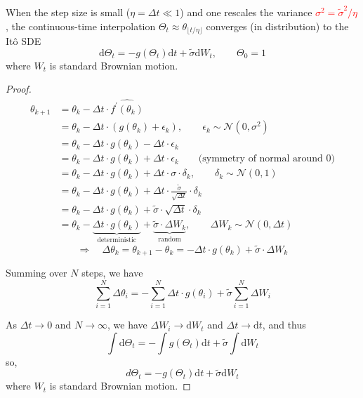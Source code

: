 \documentclass[10pt, headings=standardclasses, parskip=half, twoside]{scrartcl}
\begin{document}
\begin{theorem}\label{thm:SGD_to_SDE}
When the step size is small ($\eta=\Delta t \ll 1$) and one rescales the variance \textcolor{red}{$\sigma^2= \tilde{\sigma}^2 / \eta$}, the continuous-time interpolation $\Theta_t \approx \theta_{\lfloor t / \eta\rfloor}$ converges (in distribution) to the Itô SDE
$$
\mathrm{d} \Theta_t=-g\left(\Theta_t\right) \mathrm{d} t+\tilde{\sigma} \mathrm{d} W_t, \qquad \Theta_0=1
$$
where $W_t$ is standard Brownian motion.
\end{theorem}
\begin{proof}
\[
\begin{aligned}
\theta_{k+1} 
&= \theta_k - \Delta t \cdot \widehat{f^{\prime}\left(\theta_k\right)} \\
&= \theta_k - \Delta t \cdot (g(\theta_k) + \epsilon_k), \qquad \epsilon_k \sim \mathcal{N}(0, \sigma^2) \\
&= \theta_k - \Delta t \cdot g(\theta_k) - \Delta t \cdot \epsilon_k \\
&= \theta_k - \Delta t \cdot g(\theta_k) + \Delta t \cdot \epsilon_k \qquad \text{(symmetry of normal around 0)} \\
&= \theta_k - {\Delta t \cdot g(\theta_k)} + {\Delta t \cdot \sigma \cdot  \delta_k}, \qquad \delta_k \sim \mathcal{N}(0,1) \\
&= \theta_k - \Delta t \cdot g(\theta_k) +  \Delta t \cdot {\textstyle \frac{\tilde{\sigma}}{\sqrt{\Delta t}}} \cdot  \delta_k \\
&= \theta_k - \Delta t \cdot g(\theta_k) + \tilde{\sigma} \cdot {\sqrt{\Delta t} \cdot  \delta_k} \\
&= \theta_k - \underbrace{\Delta t \cdot g(\theta_k)}_{\text{deterministic}} + \underbrace{\tilde{\sigma} \cdot \Delta W_k}_{\text{random}}, \qquad \Delta W_k
\sim \mathcal{N}(0, \Delta t)
\end{aligned}
\] 
\[
\Longrightarrow \quad 
\boxed{
\Delta \theta_k = \theta_{k+1} - \theta_k = -\Delta t \cdot g(\theta_k) + \tilde{\sigma} \cdot \Delta W_k
}
\]

Summing over \(N\) steps, we have
\[
\sum_{i=1}^{N} \Delta \theta_i
= -\sum_{i=1}^{N} \Delta t \cdot g(\theta_i) + \tilde{\sigma} \sum_{i=1}^{N} \Delta W_i
\]

As \(\Delta t \to 0\) and \(N \to \infty\), we have
\(\Delta W_i \to \mathrm{d} W_t\) and \(\Delta t \to \mathrm{d} t\), and thus 
\[
\int \mathrm{d} \Theta_t = -\int g(\Theta_t) \mathrm{d} t + \tilde{\sigma} \int \mathrm{d} W_t
\]
so,
\[
d \Theta_t = -g(\Theta_t) \mathrm{d} t + \tilde{\sigma} \mathrm{d} W_t
\]
where \(W_t\) is standard Brownian motion.
\end{proof}
\end{document}

